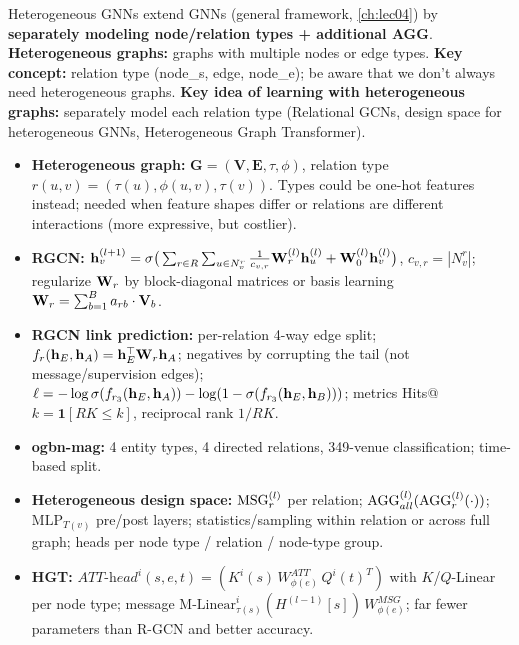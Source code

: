 \begin{keyidea}
  Heterogeneous GNNs extend GNNs (general framework, \cref{ch:lec04}) by
  \textbf{separately modeling node/relation types + additional AGG}.
  \textbf{Heterogeneous graphs:} graphs with multiple nodes or edge types.
  \textbf{Key concept:} relation type (node\_s, edge, node\_e); be aware that we
  don't always need heterogeneous graphs. \textbf{Key idea of learning with
  heterogeneous graphs:} separately model each relation type (Relational GCNs,
  design space for heterogeneous GNNs, Heterogeneous Graph Transformer).
\end{keyidea}

\bigskip{}
{}
\begin{summarybox}
  \raggedright
  \begin{itemize}
    \item \textbf{Heterogeneous graph:} $\bm{G}=(\bm{V},\bm{E},\tau,\phi)$, relation
      type $r(u,v)=(\tau(u),\phi(u,v),\tau(v))$. Types could be one-hot features
      instead; needed when feature shapes differ or relations are different
      interactions (more expressive, but costlier).
    \item \textbf{RGCN:} $\mathbf{h}_v^{(l+1)}=\sigma\big(\sum_{r\in R}\sum_{u\in N_v^r}
      \frac{1}{c_{v,r}}\mathbf{W}_r^{(l)}\mathbf{h}_u^{(l)}+\mathbf{W}_0^{(l)}\mathbf{h}_v^{(l)}\big)$,
      $c_{v,r}=|N_v^r|$; regularize $\mathbf{W}_r$ by block-diagonal matrices or basis
      learning $\mathbf{W}_r=\sum_{b=1}^{B}a_{rb}\cdot\mathbf{V}_b$.
    \item \textbf{RGCN link prediction:} per-relation 4-way edge split;
      $f_{r}(\mathbf{h}_E,\mathbf{h}_A)=\mathbf{h}_E^{\top}\mathbf{W}_{r}\mathbf{h}_A$; negatives by corrupting the
      tail (not message/supervision edges);
      $\ell=-\log\sigma(f_{r_3}(\mathbf{h}_E,\mathbf{h}_A))-\log(1-\sigma(f_{r_3}(\mathbf{h}_E,\mathbf{h}_B)))$;
      metrics Hits@$k=\mathbf{1}[RK\le k]$, reciprocal rank $1/RK$.
    \item \textbf{ogbn-mag:} 4 entity types, 4 directed relations, 349-venue
      classification; time-based split.
    \item \textbf{Heterogeneous design space:} $\operatorname{MSG}_r^{(l)}$ per relation;
      $\operatorname{AGG}_{all}^{(l)}(\operatorname{AGG}_r^{(l)}(\cdot))$; $\mathrm{MLP}_{T(v)}$ pre/post
      layers; statistics/sampling within relation or across full graph; heads
      per node type / relation / node-type group.
    \item \textbf{HGT:} $\textit{ATT-head}^{i}(s,e,t)=(K^{i}(s)\,W^{ATT}_{\phi(e)}\,Q^{i}(t)^{T})$
      with $K$/$Q$-Linear per node type; message
      $\text{M-Linear}^{i}_{\tau(s)}(H^{(l-1)}[s])\,W^{MSG}_{\phi(e)}$; far fewer
      parameters than R-GCN and better accuracy.
  \end{itemize}
\end{summarybox}
